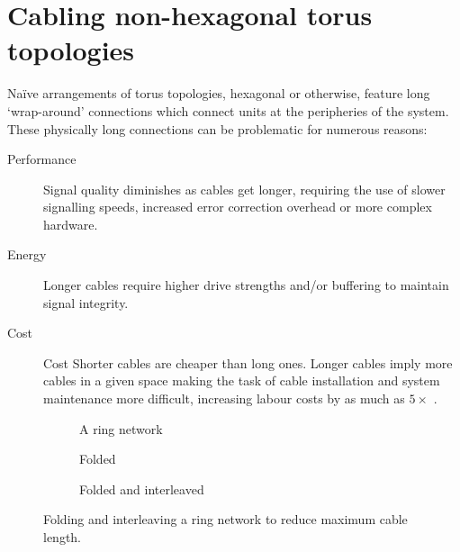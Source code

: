 	\section{Cabling non-hexagonal torus topologies}
		
		Na\"ive arrangements of torus topologies, hexagonal or otherwise, feature
		long `wrap-around' connections which connect units at the peripheries of
		the system. These physically long connections can be problematic for
		numerous reasons:
		
		\begin{description}
			
			\item[Performance] Signal quality diminishes as cables get longer,
			requiring the use of slower signalling speeds, increased error
			correction overhead or more complex hardware.
			
			\item[Energy] Longer cables require higher drive strengths and/or
			buffering to maintain signal integrity.
			
			\item[Cost] Cost Shorter cables are cheaper than long ones.  Longer
			cables imply more cables in a given space making the task of cable
			installation and system maintenance more difficult, increasing labour
			costs by as much as $5\times$ \cite{curtis12}.
			
		\end{description}
		
		\begin{figure}
			\center
			\begin{subfigure}[b]{0.39\linewidth}
				\center
				\caption{A ring network}
				\label{fig:ring-folding-row}
			\end{subfigure}
			\begin{subfigure}[b]{0.24\linewidth}
				\center
				\caption{Folded}
				\label{fig:ring-folding-folded}
			\end{subfigure}
			\begin{subfigure}[b]{0.35\linewidth}
				\center
				\caption{Folded and interleaved}
				\label{fig:ring-folding-interleaved}
			\end{subfigure}
			
			\caption{Folding and interleaving a ring network to reduce maximum cable
			length.}
			\label{fig:ring-folding}
		\end{figure}
		
